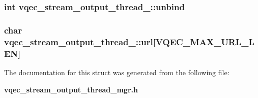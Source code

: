 \subsubsection{\setlength{\rightskip}{0pt plus 5cm}int \bf{vqec\_\-stream\_\-output\_\-thread\_\-::unbind}}\label{structvqec__stream__output__thread___c9155068aa3b63d614cc988fc143dd0f}


\subsubsection{\setlength{\rightskip}{0pt plus 5cm}char \bf{vqec\_\-stream\_\-output\_\-thread\_\-::url}[VQEC\_\-MAX\_\-URL\_\-LEN]}\label{structvqec__stream__output__thread___304e687174fef3b3e61e086fe256cfdf}




The documentation for this struct was generated from the following file:\begin{CompactItemize}
\item 
\bf{vqec\_\-stream\_\-output\_\-thread\_\-mgr.h}\end{CompactItemize}

